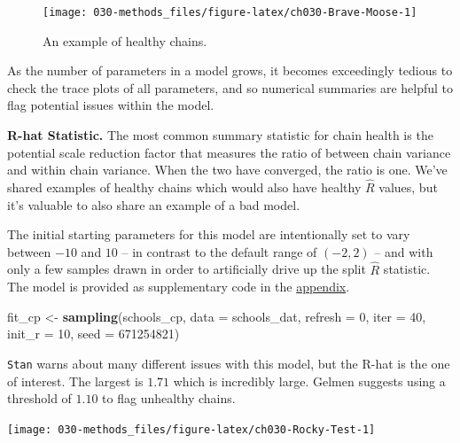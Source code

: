 \documentclass[11pt, oneside, openany]{scrbook}
\newenvironment{Shaded}{\begin{snugshade}}{\end{snugshade}}
\newcommand{\DataTypeTok}[1]{\textcolor[rgb]{0.13,0.29,0.53}{#1}}
\newcommand{\DecValTok}[1]{\textcolor[rgb]{0.00,0.00,0.81}{#1}}
\newcommand{\KeywordTok}[1]{\textcolor[rgb]{0.13,0.29,0.53}{\textbf{#1}}}
\newcommand{\NormalTok}[1]{#1}
\newcommand{\StringTok}[1]{\textcolor[rgb]{0.31,0.60,0.02}{#1}}
\begin{document}
\begin{figure}

{\centering \texttt{[image: 030-methods\_files/figure-latex/ch030-Brave-Moose-1]} 

}

\caption{An example of healthy chains.}\label{fig:ch030-Brave-Moose}
\end{figure}

As the number of parameters in a model grows, it becomes exceedingly tedious to check the trace plots of all parameters, and so numerical summaries are helpful to flag potential issues within the model.

\textbf{R-hat Statistic.} The most common summary statistic for chain health is the potential scale reduction factor \citep{gelman1992inference} that measures the ratio of between chain variance and within chain variance. When the two have converged, the ratio is one. We've shared examples of healthy chains which would also have healthy \(\hat{R}\) values, but it's valuable to also share an example of a bad model.

The initial starting parameters for this model are intentionally set to vary between \(-10\) and \(10\) -- in contrast to the default range of \((-2, 2)\) -- and with only a few samples drawn in order to artificially drive up the split \(\hat{R}\) statistic. The model is provided as supplementary code in the \protect\hyperlink{code}{appendix}.


\begin{Shaded}
\begin{Highlighting}[]
\NormalTok{fit_cp <-}\StringTok{ }\KeywordTok{sampling}\NormalTok{(schools_cp, }\DataTypeTok{data =}\NormalTok{ schools_dat, }\DataTypeTok{refresh =} \DecValTok{0}\NormalTok{,}
                   \DataTypeTok{iter =} \DecValTok{40}\NormalTok{, }\DataTypeTok{init_r =} \DecValTok{10}\NormalTok{, }\DataTypeTok{seed =} \DecValTok{671254821}\NormalTok{)}
\end{Highlighting}
\end{Shaded}


\texttt{Stan} warns about many different issues with this model, but the R-hat is the one of interest. The largest is \(1.71\) which is incredibly large. Gelmen suggests using a threshold of \(1.10\) to flag unhealthy chains.

\begin{center}\texttt{[image: 030-methods\_files/figure-latex/ch030-Rocky-Test-1]} \end{center}
\end{document}
